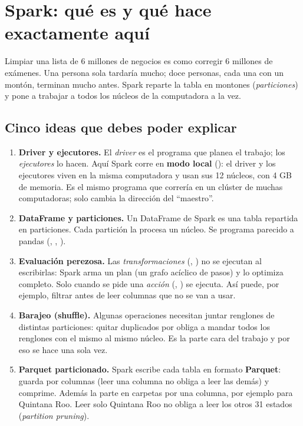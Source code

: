 \section{Spark: qué es y qué hace exactamente aquí}
\begin{intuicion}
Limpiar una lista de 6 millones de negocios es como corregir 6 millones de exámenes. Una persona sola tardaría mucho;
doce personas, cada una con un montón, terminan mucho antes. Spark reparte la tabla en montones (\emph{particiones}) y
pone a trabajar a todos los núcleos de la computadora a la vez.
\end{intuicion}

\subsection{Cinco ideas que debes poder explicar}
\begin{enumerate}
\item \textbf{Driver y ejecutores.} El \emph{driver} es el programa que planea el trabajo; los \emph{ejecutores} lo
  hacen. Aquí Spark corre en \textbf{modo local} (): el driver y los ejecutores viven en la misma
  computadora y usan sus 12 núcleos, con 4 GB de memoria. Es el mismo programa que correría en un clúster de muchas
  computadoras; solo cambia la dirección del ``maestro''.
\item \textbf{DataFrame y particiones.} Un DataFrame de Spark es una tabla repartida en particiones. Cada partición la
  procesa un núcleo. Se programa parecido a pandas (, , ).
\item \textbf{Evaluación perezosa.} Las \emph{transformaciones} (, ) no se ejecutan al
  escribirlas: Spark arma un plan (un grafo acíclico de pasos) y lo optimiza completo. Solo cuando se pide una
  \emph{acción} (, ) se ejecuta. Así puede, por ejemplo, filtrar antes de leer columnas que
  no se van a usar.
\item \textbf{Barajeo (shuffle).} Algunas operaciones necesitan juntar renglones de distintas particiones: quitar
  duplicados por  obliga a mandar todos los renglones con el mismo  al mismo núcleo. Es la parte
  cara del trabajo y por eso se hace una sola vez.
\item \textbf{Parquet particionado.} Spark escribe cada tabla en formato \textbf{Parquet}: guarda por columnas (leer una
  columna no obliga a leer las demás) y comprime. Además la parte en carpetas por una columna, por ejemplo
   para Quintana Roo. Leer solo Quintana Roo no obliga a leer los otros 31 estados
  (\emph{partition pruning}).
\end{enumerate}

